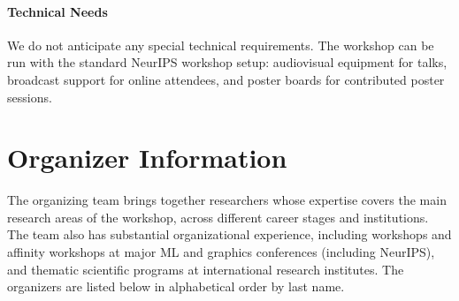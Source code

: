\documentclass{article}
\begin{document}
\paragraph{Technical Needs} We do not anticipate any special technical requirements. The workshop can be run with the standard NeurIPS workshop setup: audiovisual equipment for talks, broadcast support for online attendees, and poster boards for contributed poster sessions.

\newpage

\section{Organizer Information}
\vspace{-5mm}
The organizing team brings together researchers whose expertise covers the main research areas of the workshop, across different career stages and institutions. The team also has substantial organizational experience, including workshops and affinity workshops at major ML and graphics conferences (including NeurIPS), and thematic scientific programs at international research institutes. The organizers are listed below in alphabetical order by last name. \\
\end{document}
